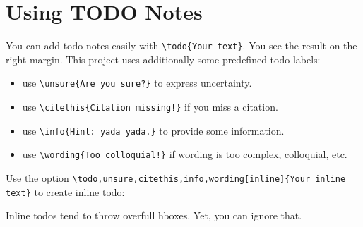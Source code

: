 \section{Using TODO Notes}

You can add todo notes easily with  \verb|\todo{Your text}|. You see the result on the right margin. This project uses additionally some predefined todo labels:

\begin{itemize}
	\setlength\itemsep{-0.75em} %
	\item use \verb|\unsure{Are you sure?}|  to express uncertainty.
	\item use \verb|\citethis{Citation missing!}|  if you miss a citation.
	\item use \verb|\info{Hint: yada yada.}|  to provide some information.
	\item use \verb|\wording{Too colloquial!}|  if wording is too complex, colloquial, etc.
\end{itemize}

Use the option \verb|\todo,unsure,citethis,info,wording[inline]{Your inline text}| to create inline todo:

Inline todos tend to throw overfull hboxes. Yet, you can ignore that.



\newpage
{}

